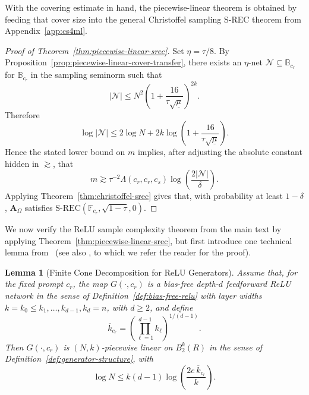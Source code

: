\documentclass{article}
\theoremstyle{plain}
\newtheorem{lemma}[theorem]{Lemma}
\theoremstyle{definition}
\theoremstyle{remark}
\begin{document}
With the covering estimate in hand, the piecewise-linear theorem is obtained by feeding that cover size into the general Christoffel sampling S-REC theorem from Appendix~\ref{app:cs4ml}.

\begin{proof}[Proof of Theorem~\ref{thm:piecewise-linear-srec}]
  Set
  $
    \eta=\tau/8.
  $
  By Proposition~\ref{prop:piecewise-linear-cover-transfer}, there exists an
  $\eta$-net $\mathcal N\subseteq\mathbb B_{c_r}$ for $\mathbb B_{c_r}$ in
  the sampling seminorm such that
  \[
    |\mathcal N|
    \leq
    N^2
    \left(
      1+
      \frac{16}
      {\tau\sqrt{\underline{\mu}}}
    \right)^{2k}.
  \]
  Therefore
  \[
    \log|\mathcal N|
    \leq
    2\log N
    +
    2k
    \log\left(
      1+
      \frac{16}
      {\tau\sqrt{\underline{\mu}}}
    \right).
  \]
  Hence the stated lower bound on $m$ implies, after adjusting the absolute
  constant hidden in $\gtrsim$, that
  \[
    m
    \gtrsim
    \tau^{-2}
    \Lambda(c_r,c_r,c_s)
    \log\left(\frac{2|\mathcal N|}{\delta}\right).
  \]
  Applying Theorem~\ref{thm:christoffel-srec} gives that, with probability
  at least $1-\delta$, $\mathbf A_\Omega$ satisfies
  $
    \mathrm{S\text{-}REC}
    \left(
      \mathbb F_{c_r},
      \sqrt{1-\tau},
      0
    \right).
  $
\end{proof}

We now verify the ReLU sample complexity theorem from the main text by applying Theorem~\ref{thm:piecewise-linear-srec}, but first introduce one technical lemma from~\cite[Lemma S2.2]{berk2022fourier} (see also \cite{naderi2021beyond}, to which we refer the reader for the proof). 

\begin{lemma}[Finite Cone Decomposition for ReLU Generators]
  \label{lem:relu-cone-decomposition}
  Assume that, for the fixed prompt $c_r$, the map $G\left(\cdot,c_r\right)$ is a bias-free depth-$d$ feedforward ReLU network in the sense of Definition~\ref{def:bias-free-relu} with layer widths
  $
    k = k_0 \leq k_1,\dots,k_{d-1},
    k_d = n
  $,
  with $d \geq 2$, and define
  \[
    \overline{k}_{c_r}
    =
    \left(
      \prod_{\ell=1}^{d-1} k_\ell
    \right)^{1/(d-1)}.
  \]
  Then $G\left(\cdot,c_r\right)$ is $(N,k)$-piecewise linear on $B_2^k(R)$ in the sense of Definition~\ref{def:generator-structure}, with
  \[
      \log N
      \leq
      k(d-1)\log\left(
        \frac{2e\,\overline{k}_{c_r}}{k}
      \right).
    \]
\end{lemma}
\end{document}
